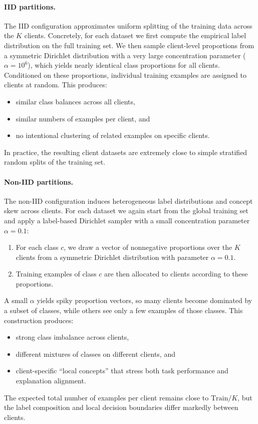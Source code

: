 \documentclass{article}
\theoremstyle{plain}
\theoremstyle{definition}
\theoremstyle{remark}
\begin{document}
\paragraph{IID partitions.}
The IID configuration approximates uniform splitting of the training data across the $K$ clients. Concretely, for each dataset we first compute the empirical label distribution on the full training set. We then sample client-level proportions from a symmetric Dirichlet distribution with a very large concentration parameter ($\alpha = 10^{6}$), which yields nearly identical class proportions for all clients. Conditioned on these proportions, individual training examples are assigned to clients at random. This produces:
\begin{itemize}
  \item similar class balances across all clients,
  \item similar numbers of examples per client, and
  \item no intentional clustering of related examples on specific clients.
\end{itemize}
In practice, the resulting client datasets are extremely close to simple stratified random splits of the training set.

\paragraph{Non-IID partitions.}
The non-IID configuration induces heterogeneous label distributions and concept skew across clients. For each dataset we again start from the global training set and apply a label-based Dirichlet sampler with a small concentration parameter $\alpha = 0.1$:
\begin{enumerate}
  \item For each class $c$, we draw a vector of nonnegative proportions over the $K$ clients from a symmetric Dirichlet distribution with parameter $\alpha = 0.1$.
  \item Training examples of class $c$ are then allocated to clients according to these proportions.
\end{enumerate}
A small $\alpha$ yields spiky proportion vectors, so many clients become dominated by a subset of classes, while others see only a few examples of those classes. This construction produces:
\begin{itemize}
  \item strong class imbalance across clients,
  \item different mixtures of classes on different clients, and
  \item client-specific ``local concepts'' that stress both task performance and explanation alignment.
\end{itemize}
The expected total number of examples per client remains close to $\text{Train} / K$, but the label composition and local decision boundaries differ markedly between clients.
\end{document}
